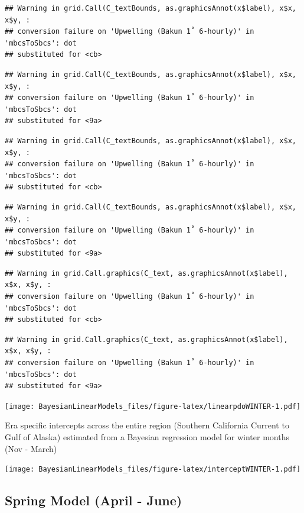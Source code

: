 \documentclass[
]{article}
\begin{document}
\begin{verbatim}
## Warning in grid.Call(C_textBounds, as.graphicsAnnot(x$label), x$x, x$y, :
## conversion failure on 'Upwelling (Bakun 1˚ 6-hourly)' in 'mbcsToSbcs': dot
## substituted for <cb>
\end{verbatim}

\begin{verbatim}
## Warning in grid.Call(C_textBounds, as.graphicsAnnot(x$label), x$x, x$y, :
## conversion failure on 'Upwelling (Bakun 1˚ 6-hourly)' in 'mbcsToSbcs': dot
## substituted for <9a>
\end{verbatim}

\begin{verbatim}
## Warning in grid.Call(C_textBounds, as.graphicsAnnot(x$label), x$x, x$y, :
## conversion failure on 'Upwelling (Bakun 1˚ 6-hourly)' in 'mbcsToSbcs': dot
## substituted for <cb>
\end{verbatim}

\begin{verbatim}
## Warning in grid.Call(C_textBounds, as.graphicsAnnot(x$label), x$x, x$y, :
## conversion failure on 'Upwelling (Bakun 1˚ 6-hourly)' in 'mbcsToSbcs': dot
## substituted for <9a>
\end{verbatim}

\begin{verbatim}
## Warning in grid.Call.graphics(C_text, as.graphicsAnnot(x$label), x$x, x$y, :
## conversion failure on 'Upwelling (Bakun 1˚ 6-hourly)' in 'mbcsToSbcs': dot
## substituted for <cb>
\end{verbatim}

\begin{verbatim}
## Warning in grid.Call.graphics(C_text, as.graphicsAnnot(x$label), x$x, x$y, :
## conversion failure on 'Upwelling (Bakun 1˚ 6-hourly)' in 'mbcsToSbcs': dot
## substituted for <9a>
\end{verbatim}

\texttt{[image: BayesianLinearModels\_files/figure-latex/linearpdoWINTER-1.pdf]}

Era specific intercepts across the entire region (Southern California
Current to Gulf of Alaska) estimated from a Bayesian regression model
for winter months (Nov - March)

\texttt{[image: BayesianLinearModels\_files/figure-latex/interceptWINTER-1.pdf]}

\hypertarget{spring-model-april---june}{%
\subsection{Spring Model (April -
June)}\label{spring-model-april---june}}
\end{document}
